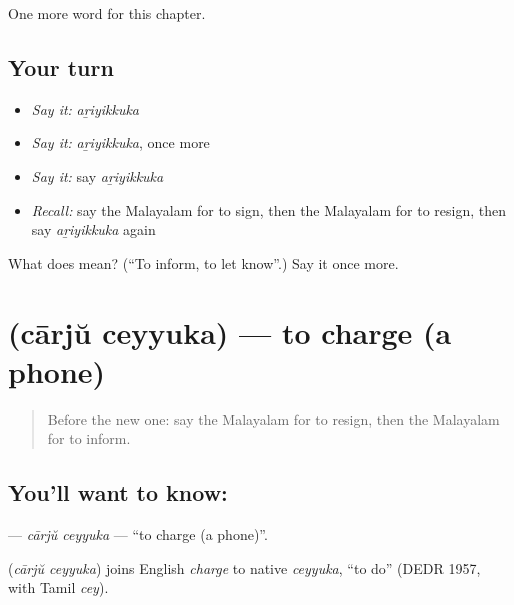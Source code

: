 \begin{grammarlens}[title={What you've built}]
One more word for this chapter.
\end{grammarlens}

\subsection*{Your turn}
\begin{itemize}
\raggedright
  \item \emph{Say it:} \emph{aṟiyikkuka}
  \item \emph{Say it:} \emph{aṟiyikkuka}, once more
  \item \emph{Say it:} say \emph{aṟiyikkuka}
  \item \emph{Recall:} say the Malayalam for to sign, then the Malayalam for to resign, then say \emph{aṟiyikkuka} again
\end{itemize}

\begin{tcolorbox}[breakable,colback=teal!4,colframe=teal!35!black,title={Before you move on}]
What does  mean? (\textquotedblleft{}To inform, to let know\textquotedblright{}.) Say it once more.
\end{tcolorbox}
\section[\texorpdfstring{\ml{ചാർജ്} \ml{ചെയ്യുക} (cārjŭ ceyyuka)}{ചാർജ് ചെയ്യുക (cārjŭ ceyyuka)}]{  (cārjŭ ceyyuka) — to charge (a phone)}

\label{lesson:ML-C185-carju-ceyyuka}



\begin{quote}
Before the new one: say the Malayalam for to resign, then the Malayalam for to inform.
\end{quote}

\subsection*{You'll want to know:  }
\textbf{ } — \emph{cārjŭ ceyyuka} — \textquotedblleft{}to charge (a phone)\textquotedblright{}.

\begin{cousinweb}
\textbf{ } (\emph{cārjŭ ceyyuka}) joins English \emph{charge} to native \emph{ceyyuka}, \textquotedblleft{}to do\textquotedblright{} (DEDR 1957, with Tamil \emph{cey}).
\end{cousinweb}

